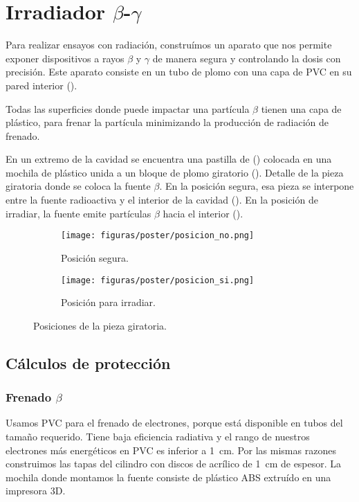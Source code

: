 \section{Irradiador $\beta$-$\gamma$}
Para realizar ensayos con radiación,
construímos un aparato que nos permite exponer dispositivos a rayos $\beta$ y
$\gamma$ de manera segura y controlando la dosis con precisión.
Este aparato consiste en un tubo de plomo con una capa de PVC en su pared
interior ().

Todas las superficies donde puede impactar una partícula $\beta$ tienen una
capa de plástico,
para frenar la partícula minimizando la producción de radiación de frenado.

En un extremo de la cavidad se encuentra una pastilla de \Strontium 
()
colocada en una mochila de plástico unida a un bloque de plomo giratorio
().
{Detalle de la pieza giratoria donde se coloca la fuente $\beta$.}
En la posición segura,
esa pieza se interpone entre la fuente radioactiva y el interior de la cavidad
().
En la posición de irradiar, la fuente emite partículas $\beta$ hacia el interior
().
\begin{figure}[H]
    \centering
    \begin{subfigure}[b]{.45\textwidth}
        \texttt{[image: figuras/poster/posicion\_no.png]}
        \caption{Posición segura.}
        \label{fig:posicionno}
    \end{subfigure}
    \hspace{5mm}
    \begin{subfigure}[b]{.45\textwidth}
        \texttt{[image: figuras/poster/posicion\_si.png]}
        \caption{Posición para irradiar.}
        \label{fig:posicionsi}
    \end{subfigure}
    \caption{Posiciones de la pieza giratoria.}
    \label{fig:posicionespieza}
\end{figure}
\subsection{Cálculos de protección}
\subsubsection{Frenado $\beta$}
Usamos PVC para el frenado de electrones, porque está disponible en tubos
del tamaño requerido.
Tiene baja eficiencia radiativa y el rango de nuestros electrones más
energéticos en PVC es inferior a \SI{1}{\centi\meter}.
Por las mismas razones construimos las tapas del cilindro con discos de
acrílico de \SI{1}{\centi\meter} de espesor.
La mochila donde montamos la fuente consiste de plástico ABS extruído en una impresora
3D.
%
